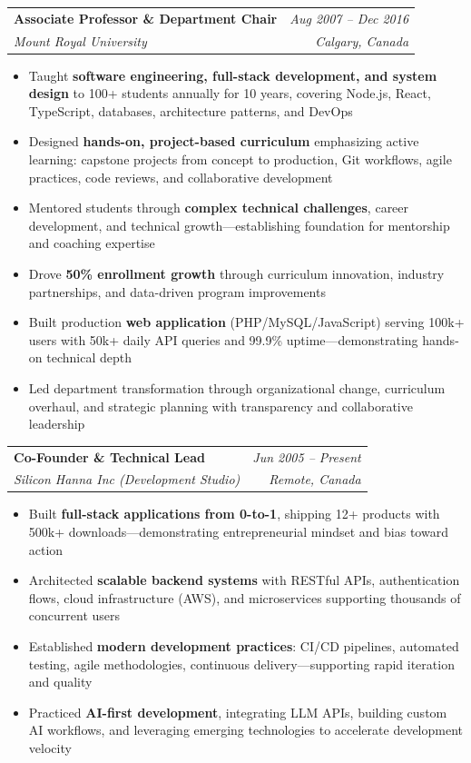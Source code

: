 \documentclass[11pt]{article}
\makeatletter
\newcommand{\tech}[1]{\textcolor{secondary}{\textbf{#1}}}
\newcommand{\experience}[4]{
  \vspace{4pt}
  \begin{tabular*}{\textwidth}{@{}l@{\extracolsep{\fill}}r@{}}
    \textbf{#1} & \textit{#2} \\
    \textit{\small#3} & \textit{\small#4}
  \end{tabular*}
  \vspace{-4pt}
}
\makeatother
\begin{document}
\experience{Associate Professor \& Department Chair}{Aug 2007 -- Dec 2016}{Mount Royal University}{Calgary, Canada}
\begin{itemize}
    \item Taught \tech{software engineering, full-stack development, and system design} to 100+ students annually for 10 years, covering Node.js, React, TypeScript, databases, architecture patterns, and DevOps
    \item Designed \tech{hands-on, project-based curriculum} emphasizing active learning: capstone projects from concept to production, Git workflows, agile practices, code reviews, and collaborative development
    \item Mentored students through \tech{complex technical challenges}, career development, and technical growth—establishing foundation for mentorship and coaching expertise
    \item Drove \tech{50\% enrollment growth} through curriculum innovation, industry partnerships, and data-driven program improvements
    \item Built production \tech{web application} (PHP/MySQL/JavaScript) serving 100k+ users with 50k+ daily API queries and 99.9\% uptime—demonstrating hands-on technical depth
    \item Led department transformation through organizational change, curriculum overhaul, and strategic planning with transparency and collaborative leadership
\end{itemize}

\experience{Co-Founder \& Technical Lead}{Jun 2005 -- Present}{Silicon Hanna Inc (Development Studio)}{Remote, Canada}
\begin{itemize}
    \item Built \tech{full-stack applications from 0-to-1}, shipping 12+ products with 500k+ downloads—demonstrating entrepreneurial mindset and bias toward action
    \item Architected \tech{scalable backend systems} with RESTful APIs, authentication flows, cloud infrastructure (AWS), and microservices supporting thousands of concurrent users
    \item Established \tech{modern development practices}: CI/CD pipelines, automated testing, agile methodologies, continuous delivery—supporting rapid iteration and quality
    \item Practiced \tech{AI-first development}, integrating LLM APIs, building custom AI workflows, and leveraging emerging technologies to accelerate development velocity
\end{itemize}
\end{document}
